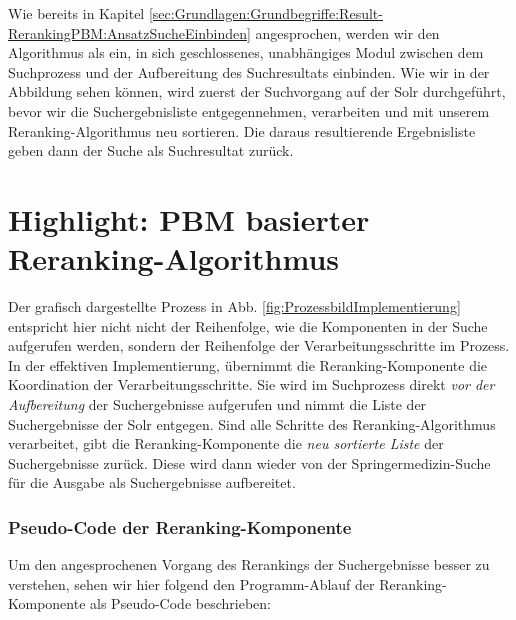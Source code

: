 Wie bereits in Kapitel \ref{sec:Grundlagen:Grundbegriffe:Result-RerankingPBM:AnsatzSucheEinbinden} angesprochen, werden wir den Algorithmus als ein, in sich geschlossenes, unabhängiges Modul zwischen dem Suchprozess und der Aufbereitung des Suchresultats einbinden. Wie wir in der Abbildung sehen können, wird zuerst der Suchvorgang auf der Solr durchgeführt, bevor wir die Suchergebnisliste entgegennehmen, verarbeiten und mit unserem Reranking-Algorithmus neu sortieren. Die daraus resultierende Ergebnisliste geben dann der Suche als Suchresultat zurück. 

\section{Highlight: PBM basierter Reranking-Algorithmus}
\label{sec:Implementierung:PBM}

Der grafisch dargestellte Prozess in Abb. \ref{fig:ProzessbildImplementierung} entspricht hier nicht nicht der Reihenfolge, wie die Komponenten in der Suche aufgerufen werden, sondern der Reihenfolge der Verarbeitungsschritte im Prozess. In der effektiven Implementierung, übernimmt die Reranking-Komponente die Koordination der Verarbeitungsschritte. Sie wird im Suchprozess direkt \textit{vor der Aufbereitung} der Suchergebnisse aufgerufen und nimmt die Liste der Suchergebnisse der Solr entgegen. Sind alle Schritte des Reranking-Algorithmus verarbeitet, gibt die Reranking-Komponente die \textit{neu sortierte Liste} der Suchergebnisse zurück. Diese wird dann wieder von der Springermedizin-Suche für die Ausgabe als Suchergebnisse aufbereitet.

\subsubsection{Pseudo-Code der Reranking-Komponente}
\label{sec:Implementierung:PBM:Pseudocode}

Um den angesprochenen Vorgang des Rerankings der Suchergebnisse besser zu verstehen, sehen wir hier folgend den Programm-Ablauf der Reranking-Komponente als Pseudo-Code beschrieben:

